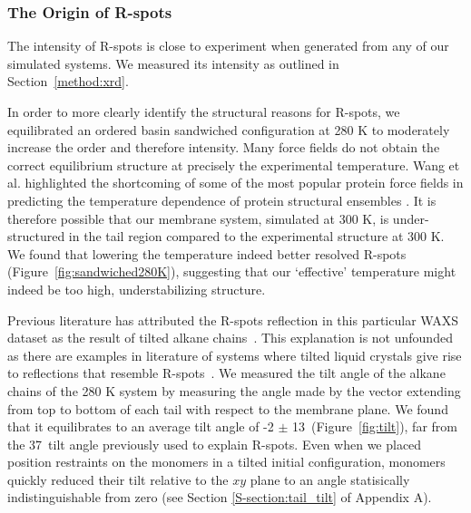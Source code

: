   \subsubsection{The Origin of R-spots}\label{section:rspots}
  
  The intensity of R-spots is close to experiment when generated from any of
  our simulated systems. We measured its intensity as outlined in Section~\ref{method:xrd}.

  In order to more clearly identify the structural reasons for R-spots, we
  equilibrated an ordered basin sandwiched configuration at 280 K to moderately
  increase the order and therefore intensity. Many force fields do not obtain
  the correct equilibrium structure at precisely the experimental temperature.
  Wang et al. highlighted the shortcoming of some of the most popular protein
  force fields in predicting the temperature dependence of protein structural
  ensembles \cite{wang_building_2017}. It is therefore possible that   %
  our membrane system, simulated at 300 K, is under-structured in the tail region
  compared to the experimental structure at 300 K. We found that lowering the
  temperature indeed better resolved R-spots (Figure~\ref{fig:sandwiched280K}),
  suggesting that our `effective' temperature might indeed be too high,
  understabilizing structure. 

  \label{addition:rspots}
  Previous literature has attributed the R-spots reflection in this particular
  WAXS dataset as the result of tilted alkane chains~\cite{feng_scalable_2014}.
  This explanation is not unfounded as there are examples in literature of
  systems where tilted liquid crystals give rise to reflections that resemble
  R-spots~\cite{percec_self-assembly_2009,gearba_homeotropic_2007}. We 
  measured the tilt angle of the alkane chains of the 280 K system by measuring
  the angle made by the vector extending from top to
  bottom of each tail with respect to the membrane plane. We found that it
  equilibrates to an average tilt angle of -2 $\pm$
  13\degree~(Figure~\ref{fig:tilt}), far from the 37\degree~tilt angle previously
  used to explain R-spots. Even when we placed position restraints on the
  monomers in a tilted initial configuration, monomers quickly reduced their tilt
  relative to the $xy$ plane to an angle statisically indistinguishable from zero
  (see Section \ref{S-section:tail_tilt} of Appendix A). 
  

